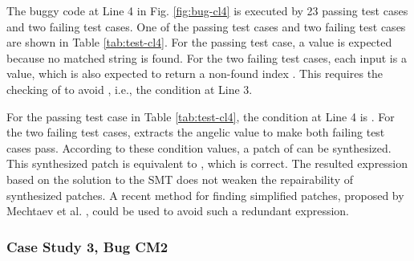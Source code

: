 The buggy code at Line 4 in Fig. \ref{fig:bug-cl4} is executed by 23 passing test cases and two failing test cases. One of the passing test cases and two failing test cases are shown in Table \ref{tab:test-cl4}. For the passing test case, a value  is expected because no matched string is found. For the two failing test cases, each input  is a  value, which is also expected to return a non-found index . This requires the checking of  to avoid , i.e., the condition at Line 3.     

For the passing test case in Table \ref{tab:test-cl4}, the condition at Line 4 is . For the two failing test cases, \nopol extracts the angelic value  to make both failing test cases pass. According to these condition values, a patch of  can be synthesized. 
This synthesized patch is equivalent to , which is correct.
The resulted expression based on the solution to the SMT does not weaken the repairability of synthesized patches.
A recent method for finding simplified patches, proposed by Mechtaev et al. \cite{mechtaev2015directfix}, could be used to avoid such a redundant expression. 

\iffalse
For the passing test case, the condition at Line 4 is \mycode{false}. For the two failing test cases, \nopol extracts the angelic value \mycode{true} to make both failing test cases pass. According to these condition values, a patch of \mycode{substr == null || startIndex == size} can be synthesized. 

However, this patch is different from the manually-written one at Line 3. The difference is that the generated patch omits the comparison of \mycode{startIndex > size}. But the following code at Lines 9 to 20 in Fig. \ref{fig:bug-cl4} shows that the checking of \mycode{startIndex > size} is not necessary. The \mycode{for} loop at Line 13 starts the traversal of the string builder. Once \mycode{startIndex > size} holds, the loop at Line 13 does not perform and the execution of the code jumps to Line 24. The code at Line 24 returns the same value as the expected values in the failing test cases. Hence the implementation of checking \mycode{startIndex > size} already exists in the code. Such existing implementation inside the source code makes the equivalent patches possible. 
\fi

\subsubsection{Case Study 3, Bug CM2} 
\label{subsubsect:bug-cm2}

